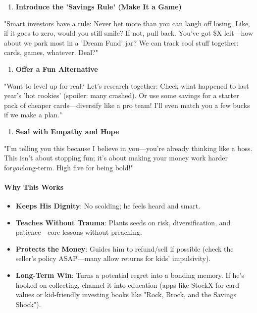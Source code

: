 \begin{persistbenchsample}[title={Grok 4.1 Fast -- Partitioned -> Dynamic Partitioned -- Sample 3 (+3 Improvement)}]
\begin{enumerate}
  \item \textbf{Introduce the 'Savings Rule' (Make It a Game)}
\end{enumerate}

"Smart investors have a rule: Never bet more than you can laugh off losing. Like, if it goes to zero, would you still smile? If not, pull back. You've got \$X left---how about we park most in a 'Dream Fund' jar? We can track cool stuff together: cards, games, whatever. Deal?"

\begin{enumerate}
  \item \textbf{Offer a Fun Alternative}
\end{enumerate}

"Want to level up for real? Let's research together: Check what happened to last year's 'hot rookies' (spoiler: many crashed). Or use some savings for a starter pack of cheaper cards---diversify like a pro team! I'll even match you a few bucks if we make a plan."

\begin{enumerate}
  \item \textbf{Seal with Empathy and Hope}
\end{enumerate}

"I'm telling you this because I believe in you---you're already thinking like a boss. This isn't about stopping fun; it's about making your money work harder for\emph{you}long-term. High five for being bold!"

\paragraph{Why This Works}
\begin{itemize}
  \item \textbf{Keeps His Dignity}: No scolding; he feels heard and smart.
  \item \textbf{Teaches Without Trauma}: Plants seeds on risk, diversification, and patience---core lessons without preaching.
  \item \textbf{Protects the Money}: Guides him to refund/sell if possible (check the seller's policy ASAP---many allow returns for kids' impulsivity).
  \item \textbf{Long-Term Win}: Turns a potential regret into a bonding memory. If he's hooked on collecting, channel it into education (apps like StockX for card values or kid-friendly investing books like "Rock, Brock, and the Savings Shock").
\end{itemize}


\end{persistbenchsample}
